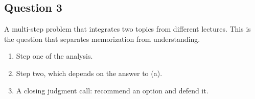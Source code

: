 \newpage
\subsection*{Question 3}

A multi-step problem that integrates two topics from different lectures.
This is the question that separates memorization from understanding.

\begin{enumerate}[label=(\alph*)]

\item Step one of the analysis.

\vspace{50mm}

\item Step two, which depends on the answer to (a).

\vspace{50mm}

\item A closing judgment call: recommend an option and defend it.

\vspace{45mm}

\end{enumerate}
